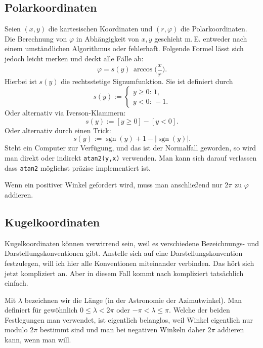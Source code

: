 \documentclass[a4paper,11pt,fleqn,twoside,BCOR=16mm]{scrartcl}
\begin{document}
\subsection{Polarkoordinaten}
Seien $(x,y)$ die kartesischen Koordinaten und $(r,\varphi)$
die Polarkoordinaten. Die Berechnung von $\varphi$ in
Abhängigkeit von $x,y$ geschieht m.\,E. entweder nach
einem umständlichen Algorithmus oder fehlerhaft.
Folgende Formel lässt sich jedoch leicht merken und deckt
alle Fälle ab:
\begin{equation}
\varphi = s(y)\,\arccos\Big(\frac{x}{r}\Big).
\end{equation}
Hierbei ist $s(y)$ die rechtsstetige
Signumfunktion. Sie ist definiert durch
\begin{equation}
s(y):=
\begin{cases}
y{\ge}0\colon\,1,\\
y{<}0\colon\,{-}1.
\end{cases}
\end{equation}
Oder alternativ via Iverson-Klammern:
\begin{equation}
s(y):=[y{\ge}0]-[y{<}0].
\end{equation}
Oder alternativ durch einen Trick:
\begin{equation}
s(y) := \operatorname{sgn}(y)+1-|\operatorname{sgn}(y)|.
\end{equation}
Steht ein Computer zur Verfügung, und das ist der Normalfall geworden,
so wird man direkt oder indirekt \verb|atan2(y,x)| verwenden.
Man kann sich darauf verlassen dass \verb|atan2| möglichst präzise
implementiert ist.

Wenn ein positiver Winkel gefordert wird, muss man
anschließend nur $2\pi$ zu $\varphi$ addieren.


\subsection{Kugelkoordinaten}

Kugelkoordinaten können verwirrend sein, weil es verschiedene
Bezeichnungs- und Darstellungskonventionen gibt. Anstelle sich auf eine
Darstellungskonvention festzulegen, will ich hier alle Konventionen
miteinander verbinden. Das hört sich jetzt kompliziert an. Aber in
diesem Fall kommt nach kompliziert tatsächlich einfach.

Mit $\lambda$ bezeichnen wir die Länge (in der Astronomie der
Azimutwinkel). Man definiert für gewöhnlich $0\le\lambda<2\pi$ oder
$-\pi<\lambda\le\pi$. Welche der beiden Festlegungen man verwendet,
ist eigentlich belanglos, weil Winkel eigentlich nur modulo $2\pi$
bestimmt sind und man bei negativen Winkeln daher $2\pi$ addieren
kann, wenn man will.
\end{document}
